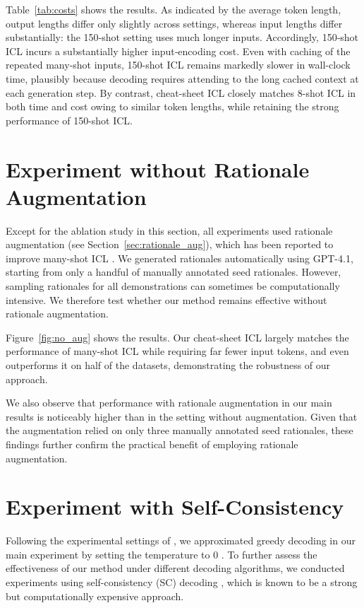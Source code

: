 \documentclass[11pt]{article}
\begin{document}
Table~\ref{tab:costs} shows the results.
As indicated by the average token length, output lengths differ only slightly across settings, whereas input lengths differ substantially: the 150‑shot setting uses much longer inputs.
Accordingly, 150‑shot ICL incurs a substantially higher input‑encoding cost.
Even with caching of the repeated many-shot inputs, 
150-shot ICL remains markedly slower in wall-clock time, plausibly because decoding requires attending to the long cached context at each generation step.
By contrast, cheat-sheet ICL closely matches 8-shot ICL in both time and cost owing to similar token lengths, while retaining the strong performance of 150-shot ICL.


\section{Experiment without Rationale Augmentation}
\label{app:expt_no_aug}
Except for the ablation study in this section, all experiments used rationale augmentation (see Section~\ref{sec:rationale_aug}), which has been reported to improve many-shot ICL \citep{agarwal2024manyshot}.
We generated rationales automatically using GPT-4.1, starting from only a handful of manually annotated seed rationales.
However, sampling rationales for all demonstrations can sometimes be computationally intensive.
We therefore test whether our method remains effective without rationale augmentation.

Figure~\ref{fig:no_aug} shows the results.
Our cheat-sheet ICL largely matches the performance of many-shot ICL while requiring far fewer input tokens, and even outperforms it on half of the datasets, demonstrating the robustness of our approach.

We also observe that performance with rationale augmentation in our main results is noticeably higher than in the setting without augmentation.
Given that the augmentation relied on only three manually annotated seed rationales, these findings further confirm the practical benefit of employing rationale augmentation.


\section{Experiment with Self-Consistency}
\label{app:expt_sc}
Following the experimental settings of \citet{agarwal2024manyshot}, we approximated greedy decoding in our main experiment by setting the temperature to 0 \citep{team2024gemini}.
To further assess the effectiveness of our method under different decoding algorithms, we conducted experiments using self-consistency (SC) decoding \citep{wang2023selfconsistency}, which is known to be a strong but computationally expensive approach.
\end{document}
